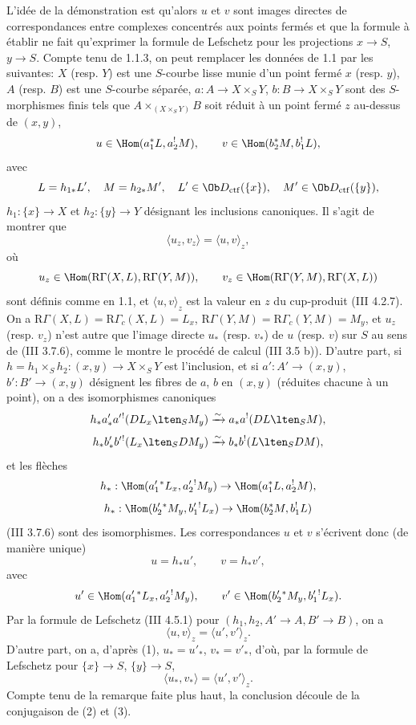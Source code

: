 L'idée de la démonstration est qu'alors $u$ et $v$ sont images directes de correspondances entre complexes concentrés aux points fermés et que la formule à établir ne fait qu'exprimer la formule de Lefschetz pour les projections $x\to S$, $y\to S$. Compte tenu de 1.1.3, on peut remplacer les données de 1.1 par les suivantes: $X$ (resp. $Y$) est une $S$-courbe lisse munie d'un point fermé $x$ (resp. $y$), $A$ (resp. $B$) est une $S$-courbe séparée, $a:A\to X\times_S Y$, $b:B\to X\times_S Y$ sont des $S$-morphismes finis tels que $A\times_{(X\times_SY)}B$ soit réduit à un point fermé $z$ au-dessus de $(x,y)$,
\[
u\in\Hom(a_1^*L,a_2^!M),\qquad v\in\Hom(b_2^*M,b_1^!L),
\]
avec
\[
L=h_{1*}L',\quad M=h_{2*}M',\quad
L'\in\Ob D_{\mathrm{ctf}}(\{x\}),\quad M'\in\Ob D_{\mathrm{ctf}}(\{y\}),
\]
$h_1:\{x\}\to X$ et $h_2:\{y\}\to Y$
désignant les inclusions canoniques. Il s'agit de montrer que
\[
\langle u_z,v_z\rangle=\langle u,v\rangle_z,
\]
où
\[
u_z\in\Hom(\mathrm{R}\Gamma(X,L),\mathrm{R}\Gamma(Y,M)),\qquad
v_z\in\Hom(\mathrm{R}\Gamma(Y,M),\mathrm{R}\Gamma(X,L))
\]
sont définis comme en 1.1, et $\langle u,v\rangle_z$ est la valeur en $z$ du cup-produit (III 4.2.7). On a $\mathrm{R}\Gamma(X,L)=\mathrm{R}\Gamma_c(X,L)=L_x$, $\mathrm{R}\Gamma(Y,M)=\mathrm{R}\Gamma_c(Y,M)=M_y$, et $u_z$ (resp. $v_z$) n'est autre que l'image directe $u_*$ (resp. $v_*$) de $u$ (resp. $v$) sur $S$ au sens de (III 3.7.6), comme le montre le procédé de calcul (III 3.5 b)). D'autre part, si $h=h_1\times_Sh_2:(x,y)\to X\times_SY$ est l'inclusion, et si $a':A'\to(x,y)$, $b':B'\to(x,y)$ désignent les fibres de $a$, $b$ en $(x,y)$ (réduites chacune à un point), on a des isomorphismes canoniques
\[
h_*a'_*a'{}^!(DL_x\lten_SM_y)
 \xrightarrow{\sim} a_*a^!(DL\lten_SM),
\]
\[
h_*b'_*b'{}^!(L_x\lten_SDM_y)
 \xrightarrow{\sim} b_*b^!(L\lten_SDM),
\]
et les flèches
\[
h_*:\Hom(a_1'{}^*L_x,a_2'{}^!M_y)\to \Hom(a_1^*L,a_2^!M),
\]
\[
h_*:\Hom(b_2'{}^*M_y,b_1'{}^!L_x)\to \Hom(b_2^*M,b_1^!L)
\]
(III 3.7.6) sont des isomorphismes. Les correspondances $u$ et $v$ s'écrivent donc (de manière unique)
\begin{equation}\tag{1}
u=h_*u',\qquad v=h_*v',
\end{equation}
avec
\[
u'\in\Hom(a_1'{}^*L_x,a_2'{}^!M_y),\qquad
v'\in\Hom(b_2'{}^*M_y,b_1'{}^!L_x).
\]
Par la formule de Lefschetz (III 4.5.1) pour $(h_1,h_2,A'\to A,B'\to B)$, on a
\begin{equation}\tag{2}
\langle u,v\rangle_z=\langle u',v'\rangle_z .
\end{equation}
D'autre part, on a, d'après (1), $u_*=u'_*$, $v_*=v'_*$, d'où, par la formule de Lefschetz pour $\{x\}\to S$, $\{y\}\to S$,
\begin{equation}\tag{3}
\langle u_*,v_*\rangle=\langle u',v'\rangle_z .
\end{equation}
Compte tenu de la remarque faite plus haut, la conclusion découle de la conjugaison de (2) et (3).

